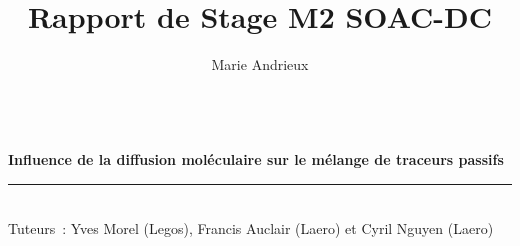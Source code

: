 \documentclass[a4paper,12pt]{article}
\date{}
\title{ \Large{Rapport de Stage M2 SOAC-DC}}
\author{Marie Andrieux}
\newcommand{\HRule}{\rule{\linewidth}{0.5mm}}
\newcommand{\blap}[1]{\vbox to 0pt{#1\vss}}
\newcommand\AtUpperLeftCorner[3]{%
  \put(\LenToUnit{#1},\LenToUnit{\dimexpr\paperheight-#2}){\blap{#3}}%
}
\newcommand\AtUpperRightCorner[3]{%
  \put(\LenToUnit{\dimexpr\paperwidth-#1},\LenToUnit{\dimexpr\paperheight-#2}){\blap{\llap{#3}}}%
}
\begin{document}
 
\thispagestyle{empty}

\let\noparref\ref
\renewcommand{\ref}[1]{(\noparref{#1})}


\begin{titlepage}
    \enlargethispage{2cm}
 
    \AddToShipoutPicture{
        }
 
    \begin{center}
        \vspace*{10cm}
        \textsc{\@title} \\
        \newline
        \large{\bf Influence de la diffusion moléculaire sur le mélange de traceurs passifs}
        \HRule
        \vspace*{0.5cm}
        \large{\@author} \\
        \newline
        \small{Tuteurs : Yves Morel (Legos), Francis Auclair (Laero) et Cyril Nguyen (Laero)}
        
    \end{center}
 
    \vspace*{9.2cm}
 
    \begin{center}
    \end{center}
 
\end{titlepage}
\ClearShipoutPicture

\newpage
\renewcommand{\thepage}{\arabic{page}}
\setcounter{page}{1}
\end{document}
